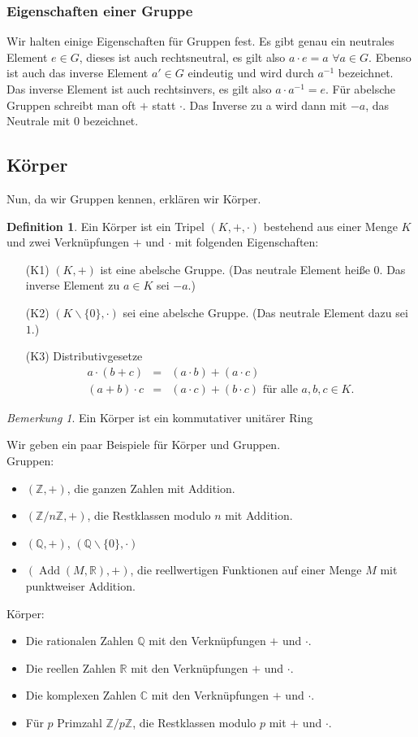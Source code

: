 \documentclass[fontsize=12pt,paper=a4,twoside,bibtotoc,idxtotoc,
liststotoc,pagesize,BCOR1.2cm,DIV15,chapterprefix,pagesize=pdftex]{scrbook}
\theoremstyle{plain}
\theoremstyle{definition}
\newtheorem{df}[equation]{Definition}
\theoremstyle{remark}
\newtheorem{bem}[equation]{Bemerkung}
\begin{document}
\subsubsection{Eigenschaften einer Gruppe}
Wir halten einige Eigenschaften für Gruppen fest. Es gibt genau ein neutrales Element $e \in G$, dieses ist auch rechtsneutral, es gilt also 
$a\cdot e=a$ $\forall a\in G$. Ebenso ist auch das inverse Element $a'\in G$ eindeutig und wird durch $a^{-1}$ bezeichnet. Das inverse 
Element ist auch rechtsinvers, es gilt also $a\cdot a^{-1}=e$. Für abelsche Gruppen schreibt man oft $+$ statt $\cdot$. Das Inverse zu 
a wird dann mit $-a$, das Neutrale mit $0$ bezeichnet.
\subsection{Körper}
Nun, da wir Gruppen kennen, erklären wir Körper.
\begin{df}
 Ein Körper ist ein Tripel $(K,+,\cdot)$ bestehend aus einer
Menge $K$ und zwei Verknüpfungen $+$ und $\cdot$ mit folgenden
Eigenschaften:
\begin{itemize}
 \item[(K1)] $(K,+)$ ist eine abelsche Gruppe. (Das neutrale Element
heiße $0$. Das inverse Element zu $a \in K$ sei $-a$.) 
 \item[(K2)] $(K \smallsetminus \{ 0 \}, \cdot)$ sei eine abelsche
Gruppe. (Das neutrale Element dazu sei $1$.)
 \item[(K3)] Distributivgesetze
\begin{eqnarray*}
a \cdot (b + c) & = & (a \cdot b) + (a \cdot c)\\
(a+b) \cdot c & = &   (a \cdot c) + (b \cdot c) \mbox{ für alle }
a,b,c \in K.
\end{eqnarray*}
\end{itemize}
\end{df}
\begin{bem}
 Ein Körper ist ein kommutativer unitärer Ring
\end{bem}
Wir geben ein paar Beispiele für Körper und Gruppen.\\
Gruppen:
\begin{itemize}
 \item$(\mathbb{Z},+)$, die ganzen Zahlen mit Addition.
 \item$(\mathbb{Z}/n\mathbb{Z},+)$, die Restklassen modulo $n$ mit Addition.
 \item$(\mathbb{Q},+)$, $(\mathbb{Q} \smallsetminus \{ 0 \} ,\cdot)$
 \item$(\mathop{Add}(M,\mathbb{R}),+)$, die reellwertigen Funktionen auf einer Menge $M$ mit punktweiser Addition.
\end{itemize} 
Körper:
\begin{itemize}
 \item Die rationalen Zahlen $\mathbb{Q}$ mit den Verknüpfungen $+$ und $\cdot$.
 \item Die reellen Zahlen $\mathbb{R}$ mit den Verknüpfungen $+$ und $\cdot$.
 \item Die komplexen Zahlen $\mathbb{C}$ mit den Verknüpfungen $+$ und $\cdot$.
 \item Für $p$ Primzahl $\mathbb{Z}/p\mathbb{Z}$, die Restklassen modulo $p$ mit $+$ und $\cdot$.
\end{itemize}
\end{document}

